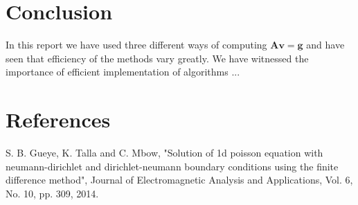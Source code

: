 \documentclass[american,a4paper,12pt]{article}
\renewcommand{\vec}[1]{\mathbf{#1}} %
\begin{document}
\section{Conclusion}
In this report we have used three different ways of computing $\vec{A}\vec{v} = \vec{g}$ and have seen that efficiency of the methods vary greatly. We have witnessed the importance of efficient implementation of algorithms ...


\section{References} %

\begin{thebibliography}{9}
 S. B. Gueye, K. Talla and C. Mbow, "Solution of 1d poisson equation with neumann-dirichlet and dirichlet-neumann boundary conditions using the finite difference method", Journal of Electromagnetic Analysis and Applications, Vol. 6, No. 10, pp. 309, 2014.





\end{thebibliography}
\end{document}
